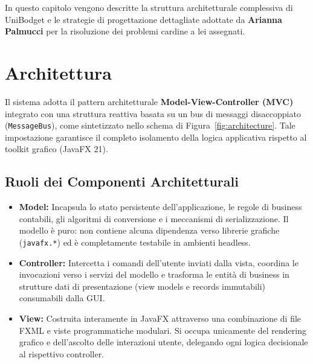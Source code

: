 \documentclass[11pt,a4paper,openright]{report}
\begin{document}
In questo capitolo vengono descritte la struttura architetturale complessiva di UniBodget e le strategie di progettazione dettagliate adottate da \textbf{Arianna Palmucci} per la risoluzione dei problemi cardine a lei assegnati.

\section{Architettura}
\enlargethispage{3\baselineskip}
Il sistema adotta il pattern architetturale \textbf{Model-View-Controller (MVC)} integrato con una struttura reattiva basata su un bus di messaggi disaccoppiato (\texttt{MessageBus}), come sintetizzato nello schema di Figura~\ref{fig:architecture}. Tale impostazione garantisce il completo isolamento della logica applicativa rispetto al toolkit grafico (JavaFX 21).

\subsection*{Ruoli dei Componenti Architetturali}
\begin{itemize}
  \item \textbf{Model:} Incapsula lo stato persistente dell'applicazione, le regole di business contabili, gli algoritmi di conversione e i meccanismi di serializzazione. Il modello è puro: non contiene alcuna dipendenza verso librerie grafiche (\texttt{javafx.*}) ed è completamente testabile in ambienti headless.
  \item \textbf{Controller:} Intercetta i comandi dell'utente inviati dalla vista, coordina le invocazioni verso i servizi del modello e trasforma le entità di business in strutture dati di presentazione (view models e records immutabili) consumabili dalla GUI.
  \item \textbf{View:} Costruita interamente in JavaFX attraverso una combinazione di file FXML e viste programmatiche modulari. Si occupa unicamente del rendering grafico e dell'ascolto delle interazioni utente, delegando ogni logica decisionale al rispettivo controller.
\end{itemize}
\end{document}
